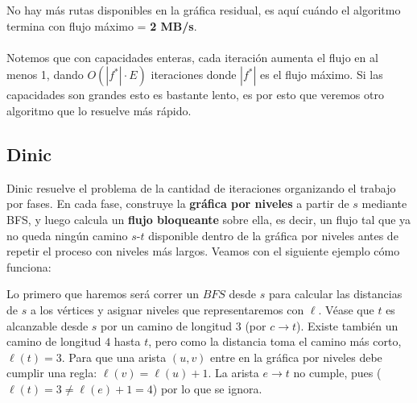 No hay más rutas disponibles en la gráfica residual, es aquí cuándo el algoritmo termina con flujo máximo = \textbf{2 MB/s}.
\\\\
Notemos que con capacidades enteras, cada iteración aumenta el
flujo en al menos 1, dando $O(|f^*| \cdot E)$ iteraciones donde $|f^*|$
es el flujo máximo. Si las capacidades son grandes esto es bastante lento, es por esto que veremos otro algoritmo que lo resuelve más rápido.
\subsection{Dinic} 
Dinic resuelve el problema de la cantidad de iteraciones organizando el trabajo por fases. En cada fase, construye la \textbf{gráfica por niveles} a partir de $s$ mediante BFS, y luego calcula un \textbf{flujo bloqueante} sobre ella, es decir, un flujo tal que ya no queda ningún camino $s$-$t$ disponible dentro de la gráfica por niveles antes de repetir el proceso con niveles más largos. Veamos con el siguiente ejemplo cómo funciona:

Lo primero que haremos será correr un $BFS$ desde $s$ para calcular las distancias de $s$ a los vértices y asignar niveles que representaremos con $\ell$. Véase que $t$ es alcanzable desde $s$ por un camino de longitud $3$ (por $c\to t$). Existe también un camino de longitud $4$ hasta $t$, pero como la distancia toma el camino más corto,  $\ell(t)=3$. Para que una arista $(u,v)$ entre en la gráfica por niveles debe cumplir una regla: $\ell(v) = \ell(u)+1$. La arista $e\to t$ no cumple, pues ($\ell(t)=3 \neq \ell(e)+1=4$) por lo que se ignora.
 
